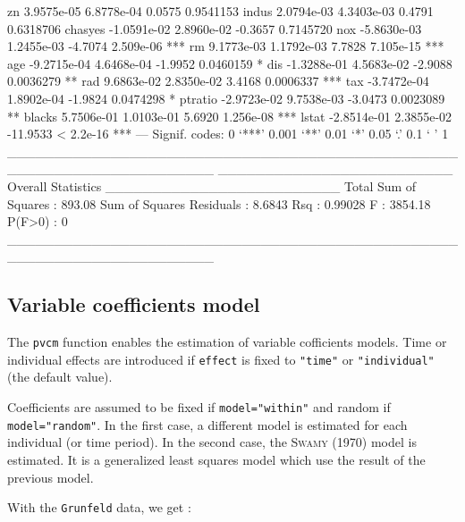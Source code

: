 \documentclass{article}
\begin{document}
\begin{Schunk}
\begin{Soutput}
zn           3.9575e-05  6.8778e-04   0.0575 0.9541153    
indus        2.0794e-03  4.3403e-03   0.4791 0.6318706    
chasyes     -1.0591e-02  2.8960e-02  -0.3657 0.7145720    
nox         -5.8630e-03  1.2455e-03  -4.7074 2.509e-06 ***
rm           9.1773e-03  1.1792e-03   7.7828 7.105e-15 ***
age         -9.2715e-04  4.6468e-04  -1.9952 0.0460159 *  
dis         -1.3288e-01  4.5683e-02  -2.9088 0.0036279 ** 
rad          9.6863e-02  2.8350e-02   3.4168 0.0006337 ***
tax         -3.7472e-04  1.8902e-04  -1.9824 0.0474298 *  
ptratio     -2.9723e-02  9.7538e-03  -3.0473 0.0023089 ** 
blacks       5.7506e-01  1.0103e-01   5.6920 1.256e-08 ***
lstat       -2.8514e-01  2.3855e-02 -11.9533 < 2.2e-16 ***
---
Signif. codes:  0 ‘***’ 0.001 ‘**’ 0.01 ‘*’ 0.05 ‘.’ 0.1 ‘ ’ 1 
______________________________________________________________________ 
_________________________ Overall Statistics _________________________
Total Sum of Squares       : 893.08
Sum of Squares Residuals   : 8.6843
Rsq                        : 0.99028
F                          : 3854.18
P(F>0)                     : 0
______________________________________________________________________ 
\end{Soutput}
\end{Schunk}


\subsection{Variable coefficients model}

The \texttt{pvcm} function enables the estimation of variable
cofficients models. Time or individual effects are introduced if
\texttt{effect} is fixed to \texttt{"time"} or \texttt{"individual"}
(the default value). 

Coefficients are assumed to be fixed if \texttt{model="within"} and
random if \texttt{model="random"}. In the first case, a different
model is estimated for each individual (or time period). In the second
case, the \textsc{Swamy} (1970) model is estimated. It is a
generalized least squares model which use the result of the previous model.


With the \texttt{Grunfeld} data, we get :
\end{document}
